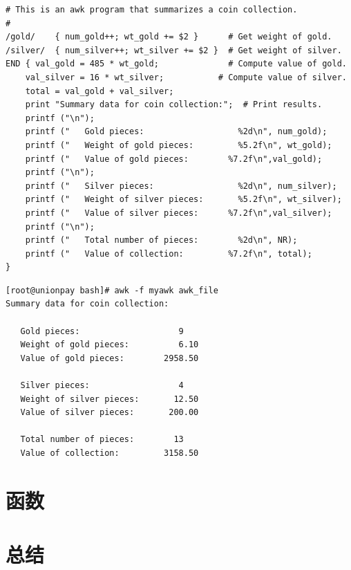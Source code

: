 \begin{verbatim}
# This is an awk program that summarizes a coin collection.
#
/gold/    { num_gold++; wt_gold += $2 }      # Get weight of gold.
/silver/  { num_silver++; wt_silver += $2 }  # Get weight of silver.
END { val_gold = 485 * wt_gold;              # Compute value of gold.
    val_silver = 16 * wt_silver;           # Compute value of silver.
    total = val_gold + val_silver;
    print "Summary data for coin collection:";  # Print results.
    printf ("\n");
    printf ("   Gold pieces:                   %2d\n", num_gold);
    printf ("   Weight of gold pieces:         %5.2f\n", wt_gold);
    printf ("   Value of gold pieces:        %7.2f\n",val_gold);
    printf ("\n");
    printf ("   Silver pieces:                 %2d\n", num_silver);
    printf ("   Weight of silver pieces:       %5.2f\n", wt_silver);
    printf ("   Value of silver pieces:      %7.2f\n",val_silver);
    printf ("\n");
    printf ("   Total number of pieces:        %2d\n", NR);
    printf ("   Value of collection:         %7.2f\n", total);
}
\end{verbatim}

\begin{verbatim}
[root@unionpay bash]# awk -f myawk awk_file 
Summary data for coin collection:

   Gold pieces:                    9
   Weight of gold pieces:          6.10
   Value of gold pieces:        2958.50

   Silver pieces:                  4
   Weight of silver pieces:       12.50
   Value of silver pieces:       200.00

   Total number of pieces:        13
   Value of collection:         3158.50
\end{verbatim}

\section{函数}

\section{总结}

